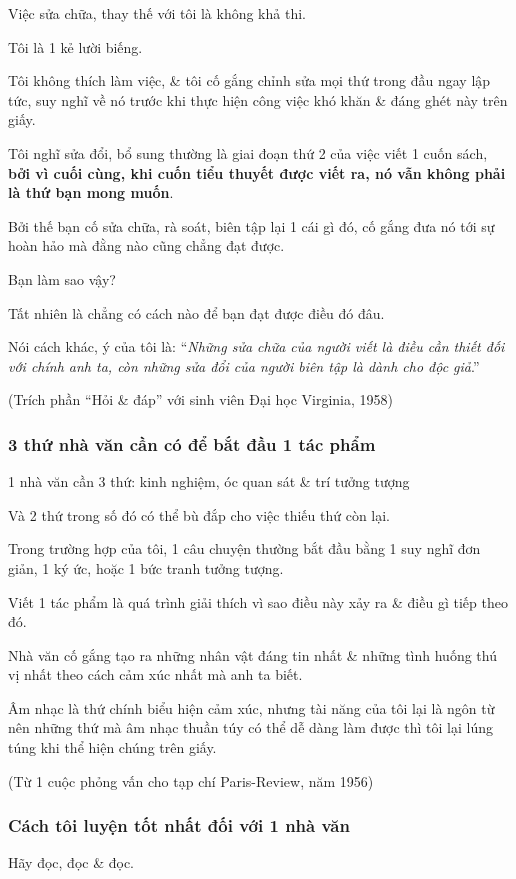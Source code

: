 \documentclass{article}
\begin{document}
Việc sửa chữa, thay thế với tôi là không khả thi.

Tôi là 1 kẻ lười biếng.

Tôi không thích làm việc, \& tôi cố gắng chỉnh sửa mọi thứ trong đầu ngay lập tức, suy nghĩ về nó trước khi thực hiện công việc khó khăn \& đáng ghét này trên giấy.

Tôi nghĩ sửa đổi, bổ sung thường là giai đoạn thứ 2 của việc viết 1 cuốn sách,\textbf{ bởi vì cuối cùng, khi cuốn tiểu thuyết được viết ra, nó vẫn không phải là thứ bạn mong muốn}.

Bởi thế bạn cố sửa chữa, rà soát, biên tập lại 1 cái gì đó, cố gắng đưa nó tới sự hoàn hảo mà đằng nào cũng chẳng đạt được.

Bạn làm sao vậy?

Tất nhiên là chẳng có cách nào để bạn đạt được điều đó đâu.

Nói cách khác, ý của tôi là: ``\textit{Những sửa chữa của người viết là điều cần thiết đối với chính anh ta, còn những sửa đổi của người biên tập là dành cho độc giả}.''

(Trích phần ``Hỏi \& đáp'' với sinh viên Đại học Virginia, 1958)

\subsubsection{3 thứ nhà văn cần có để bắt đầu 1 tác phẩm}
1 nhà văn cần 3 thứ: kinh nghiệm, óc quan sát \& trí tưởng tượng

Và 2 thứ trong số đó có thể bù đắp cho việc thiếu thứ còn lại.

Trong trường hợp của tôi, 1 câu chuyện thường bắt đầu bằng 1 suy nghĩ đơn giản, 1 ký ức, hoặc 1 bức tranh tưởng tượng.

Viết 1 tác phẩm là quá trình giải thích vì sao điều này xảy ra \& điều gì tiếp theo đó.

Nhà văn cố gắng tạo ra những nhân vật đáng tin nhất \& những tình huống thú vị nhất theo cách cảm xúc nhất mà anh ta biết.

Âm nhạc là thứ chính biểu hiện cảm xúc, nhưng tài năng của tôi lại là ngôn từ nên những thứ mà âm nhạc thuần túy có thể dễ dàng làm được thì tôi lại lúng túng khi thể hiện chúng trên giấy.

(Từ 1 cuộc phỏng vấn cho tạp chí Paris-Review, năm 1956)

\subsubsection{Cách tôi luyện tốt nhất đối với 1 nhà văn}
Hãy đọc, đọc \& đọc.
\end{document}
